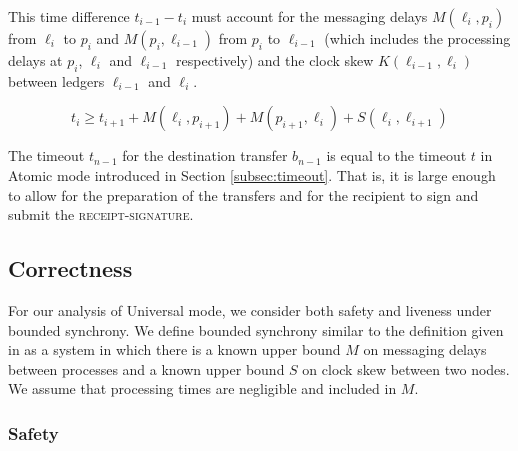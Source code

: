 \documentclass[letterpaper,twocolumn,10pt]{article}
\begin{document}
This time difference $t_{i-1} - t_i$ must account for the messaging delays $M(\ell_i, p_i)$ from $\ell_i$ to $p_i$ and $M(p_i, \ell_{i-1})$ from $p_i$ to $\ell_{i-1}$ (which includes the processing delays at $p_i$, $\ell_i$ and $\ell_{i-1}$ respectively) and the clock skew $K(\ell_{i-1}, \ell_i)$ between ledgers $\ell_{i-1}$ and $\ell_i$.

\begin{equation}
\label{eq:expiration-delta}
t_i \geq t_{i+1} + M(\ell_i, p_{i+1}) + M(p_{i+1}, \ell_i) + S(\ell_i, \ell_{i+1})
\end{equation}

The timeout $t_{n-1}$ for the destination transfer $b_{n-1}$ is equal to the timeout $t$ in Atomic mode introduced in Section \ref{subsec:timeout}. That is, it is large enough to allow for the preparation of the transfers and for the recipient to sign and submit the \textsc{receipt-signature}.





\subsection{Correctness}


For our analysis of Universal mode, we consider both safety and liveness under bounded synchrony. We define bounded synchrony similar to the definition given in \cite{dwork1988consensus} as a system in which there is a known upper bound $M$ on messaging delays between processes and a known upper bound $S$ on clock skew between two nodes. We assume that processing times are negligible and included in $M$.

\subsubsection{Safety}
\end{document}
